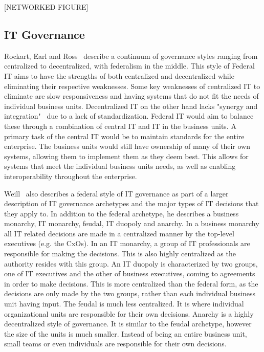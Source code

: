 [NETWORKED FIGURE]

\subsection{IT Governance}
Rockart, Earl and Ross~\cite{Rockart1996} describe a continuum of governance styles ranging from centralized to decentralized, with federalism in the middle. This style of Federal IT aims to have the strengths of both centralized and decentralized while eliminating their respective weaknesses. Some key weaknesses of centralized IT to eliminate are slow responsiveness and having systems that do not fit the needs of individual business units. Decentralized IT on the other hand lacks "synergy and integration"~\cite{Rockart1996} due to a lack of standardization. Federal IT would aim to balance these through a combination of central IT and IT in the business units. A primary task of the central IT would be to maintain standards for the entire enterprise. The business units would still have ownership of many of their own systems, allowing them to implement them as they deem best. This allows for systems that meet the individual business units needs, as well as enabling interoperability throughout the enterprise. 

Weill~\cite{Weill2004} also describes a federal style of IT governance as part of a larger description of IT governance archetypes and the major types of IT decisions that they apply to. In addition to the federal archetype, he describes a business monarchy, IT monarchy, feudal, IT duopoly and anarchy. In a business monarchy all IT related decisions are made in a centralized manner by the top-level executives (e.g. the CxOs). In an IT monarchy, a group of IT professionals are responsible for making the decisions. This is also highly centralized as the authority resides with this group. An IT duopoly is characterized by two groups, one of IT executives and the other of business executives, coming to agreements in order to make decisions. This is more centralized than the federal form, as the decisions are only made by the two groups, rather than each individual business unit having input. The feudal is much less centralized. It is where individual organizational units are responsible for their own decisions. Anarchy is a highly decentralized style of governance. It is similar to the feudal archetype, however the size of the units is much smaller. Instead of being an entire business unit, small teams or even individuals are responsible for their own decisions.

